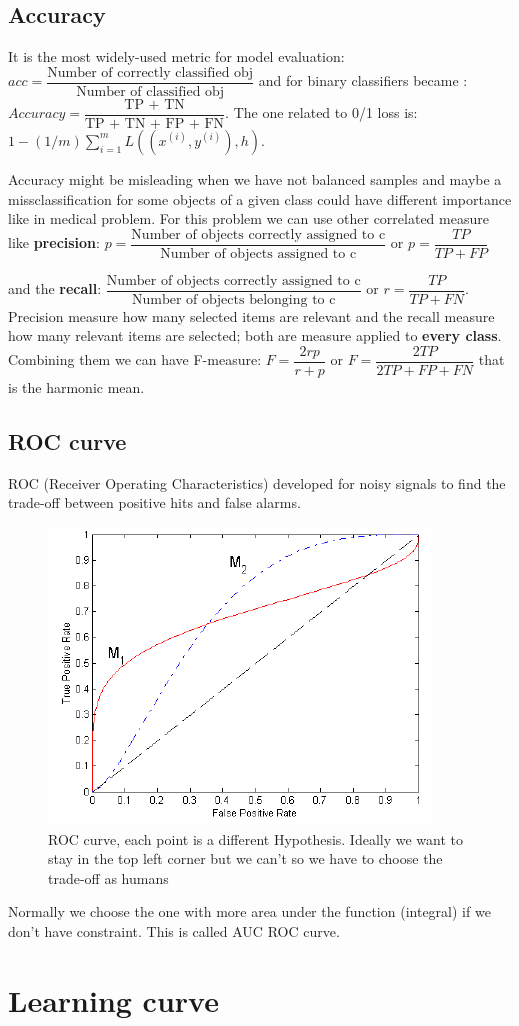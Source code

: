 \subsection{Accuracy}
It is the most widely-used metric for model evaluation: $acc = \dfrac{\text{Number of correctly classified obj}}{\text{Number of classified obj}}$ and for binary classifiers became : 
$ Accuracy = \dfrac{\text{TP + TN}}{\text{TP + TN + FP + FN}}$. The one related to 0/1 loss is: $ 1- (1/m) \sum\limits_{i=1}^m L((x^{(i)}, y^{(i)}),h) $.

Accuracy might be misleading when we have not balanced samples and maybe a missclassification for some objects of a given class could have different importance like in medical problem. For this problem we can use other correlated measure like \textbf{precision}:
$ p = \dfrac{\text{Number of objects correctly assigned to c}}{\text{Number of objects assigned to c}}$ or $ p = \dfrac{TP}{TP+FP}$ 

and the \textbf{recall}:
$ \dfrac{\text{Number of objects correctly assigned to c}}{\text{Number of objects belonging to c}}$ or $ r = \dfrac{TP}{TP+FN}$. Precision measure how many selected items are relevant and the recall measure how many relevant items are selected; both are measure applied to \textbf{every class}. Combining them we can have F-measure: $F = \dfrac{2rp}{r+p} $ or $F=\dfrac{2TP}{2TP + FP +FN}$ that is the harmonic mean.

\subsection{ROC curve}
ROC (Receiver Operating Characteristics) developed for noisy signals to find the trade-off between positive hits and false alarms.

\begin{figure}[H]
    \centering
    \includegraphics[scale=0.6]{images/PM/PM2.png}
    \caption{ROC curve, each point is a different Hypothesis. Ideally we want to stay in the top left corner but we can't so we have to choose the trade-off as humans}
    \label{fig:enter-label}
\end{figure}

Normally we choose the one with more area under the function (integral) if we don't have constraint. This is called AUC ROC curve.


\section{Learning curve}
